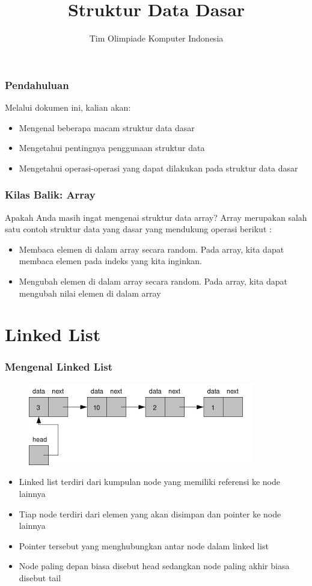 

\title{Struktur Data Dasar}
\author{Tim Olimpiade Komputer Indonesia}
\date{}


%
\begin{frame}
\titlepage
\end{frame}

\begin{frame}
\frametitle{Pendahuluan}
Melalui dokumen ini, kalian akan:
\begin{itemize}
  \item Mengenal beberapa macam struktur data dasar
  \item Mengetahui pentingnya penggunaan struktur data
  \item Mengetahui operasi-operasi yang dapat dilakukan pada struktur data dasar
\end{itemize}
\end{frame}

\begin{frame}
\frametitle{Kilas Balik: Array}
Apakah Anda masih ingat mengenai struktur data array?
Array merupakan salah satu contoh struktur data yang dasar yang mendukung operasi berikut :
\begin{itemize}
  \item Membaca elemen di dalam array secara random. Pada array, kita dapat membaca elemen pada indeks yang kita inginkan.
  \item Mengubah elemen di dalam array secara random. Pada array, kita dapat mengubah nilai elemen di dalam array
\end{itemize} 
\end{frame}

\section{Linked List}
\frame{\sectionpage}

\begin{frame}
\frametitle{Mengenal Linked List}
\begin{figure}
  \centering
  \includegraphics[width=6 cm]{asset/linkedlist.png}
\end{figure}
\begin{itemize}
  \item Linked list terdiri dari kumpulan \alert{node} yang memiliki referensi ke node lainnya
  \item Tiap node terdiri dari elemen yang akan disimpan dan \alert{pointer} ke node lainnya
  \item Pointer tersebut yang menghubungkan antar node dalam linked list
  \item Node paling depan biasa disebut \alert{head} sedangkan node paling akhir biasa disebut \alert{tail}
\end{itemize}
\end{frame}

